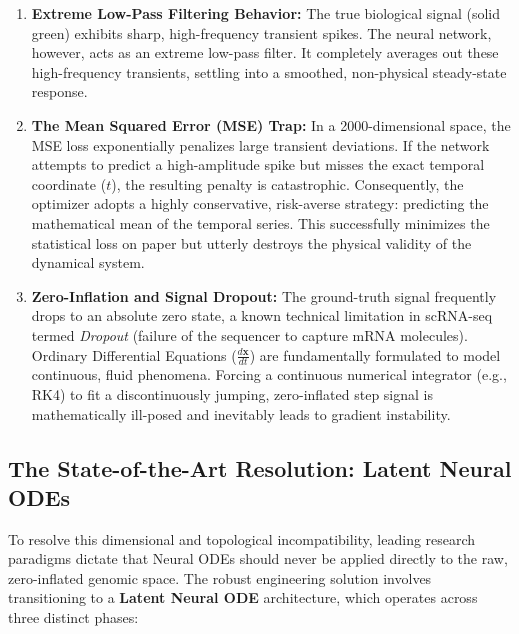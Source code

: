 \documentclass[12pt, a4paper]{article}
\begin{document}
	\begin{enumerate}
		\item \textbf{Extreme Low-Pass Filtering Behavior:} The true biological signal (solid green) exhibits sharp, high-frequency transient spikes. The neural network, however, acts as an extreme low-pass filter. It completely averages out these high-frequency transients, settling into a smoothed, non-physical steady-state response. 
		\item \textbf{The Mean Squared Error (MSE) Trap:} In a 2000-dimensional space, the MSE loss exponentially penalizes large transient deviations. If the network attempts to predict a high-amplitude spike but misses the exact temporal coordinate ($t$), the resulting penalty is catastrophic. Consequently, the optimizer adopts a highly conservative, risk-averse strategy: predicting the mathematical mean of the temporal series. This successfully minimizes the statistical loss on paper but utterly destroys the physical validity of the dynamical system.
		\item \textbf{Zero-Inflation and Signal Dropout:} The ground-truth signal frequently drops to an absolute zero state, a known technical limitation in scRNA-seq termed \textit{Dropout} (failure of the sequencer to capture mRNA molecules). Ordinary Differential Equations ($\frac{d\mathbf{x}}{dt}$) are fundamentally formulated to model continuous, fluid phenomena. Forcing a continuous numerical integrator (e.g., RK4) to fit a discontinuously jumping, zero-inflated step signal is mathematically ill-posed and inevitably leads to gradient instability.
	\end{enumerate}
	
	\subsection{The State-of-the-Art Resolution: Latent Neural ODEs}
	To resolve this dimensional and topological incompatibility, leading research paradigms dictate that Neural ODEs should never be applied directly to the raw, zero-inflated genomic space. The robust engineering solution involves transitioning to a \textbf{Latent Neural ODE} architecture, which operates across three distinct phases:
	
\end{document}
